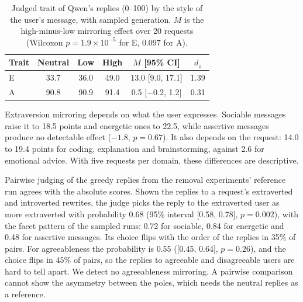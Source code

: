 \begin{table}[t]
\centering
\small
\setlength{\tabcolsep}{4pt}
\begin{tabular}{@{}lccccc@{}}
\toprule
Trait & Neutral & Low & High & $M$ [95\% CI] & $d_z$ \\
\midrule
E & 33.7 & 36.0 & 49.0 & 13.0 [9.0, 17.1] & 1.39 \\
A & 90.8 & 90.9 & 91.4 & 0.5 [$-$0.2, 1.2] & 0.31 \\
\bottomrule
\end{tabular}
\caption{Judged trait of Qwen's replies (0--100) by the style of the user's message, with sampled generation. $M$ is the high-minus-low mirroring effect over 20 requests (Wilcoxon $p = 1.9 \times 10^{-5}$ for E, $0.097$ for A).}
\label{tab:mirroring}
\end{table}

Extraversion mirroring depends on what the user expresses. Sociable messages raise it to 18.5 points and energetic ones to 22.5, while assertive messages produce no detectable effect ($-1.8$, $p = 0.67$). It also depends on the request: 14.0 to 19.4 points for coding, explanation and brainstorming, against 2.6 for emotional advice. With five requests per domain, these differences are descriptive.

Pairwise judging of the greedy replies from the removal experiments' reference run agrees with the absolute scores. Shown the replies to a request's extraverted and introverted rewrites, the judge picks the reply to the extraverted user as more extraverted with probability 0.68 (95\% interval [0.58, 0.78], $p = 0.002$), with the facet pattern of the sampled runs: 0.72 for sociable, 0.84 for energetic and 0.48 for assertive messages. Its choice flips with the order of the replies in 35\% of pairs. For agreeableness the probability is 0.55 ([0.45, 0.64], $p = 0.26$), and the choice flips in 45\% of pairs, so the replies to agreeable and disagreeable users are hard to tell apart. We detect no agreeableness mirroring. A pairwise comparison cannot show the asymmetry between the poles, which needs the neutral replies as a reference.

